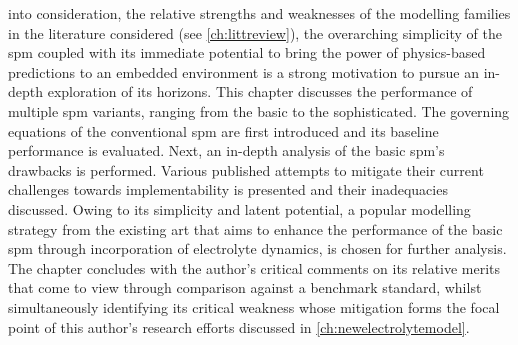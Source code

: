 

   into   consideration,   the  relative   strengths   and
weaknesses  of  the  modelling  families   in  the  literature  considered  (see
\cref{ch:littreview}), the overarching simplicity  of the \gls{spm} coupled with
its immediate  potential to bring the  power of physics-based predictions  to an
embedded environment is a strong motivation to pursue an in-depth exploration of
its  horizons. This  chapter  discusses the  performance  of multiple  \gls{spm}
variants, ranging from  the basic to the sophisticated.  The governing equations
of the conventional \gls{spm} are  first introduced and its baseline performance
is evaluated. Next,  an in-depth analysis of the basic  \gls{spm}'s drawbacks is
performed.  Various  published attempts  to  mitigate  their current  challenges
towards implementability is presented and their inadequacies discussed. Owing to
its  simplicity and  latent potential,  a  popular modelling  strategy from  the
existing  art that  aims  to  enhance the  performance  of  the basic  \gls{spm}
through incorporation of  electrolyte dynamics, is chosen  for further analysis.
The  chapter concludes  with  the  author's critical  comments  on its  relative
merits  that come  to  view  through comparison  against  a benchmark  standard,
whilst  simultaneously  identifying  its   critical  weakness  whose  mitigation
forms  the  focal   point  of  this  author's  research   efforts  discussed  in
\cref{ch:newelectrolytemodel}.

